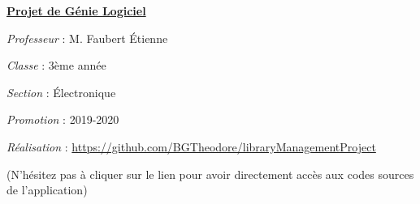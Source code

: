 \documentclass[a4paper,12pt]{report}
\begin{document}
\begin{center}
    \textbf{\underline{Projet de Génie Logiciel}} \par 
    \textit{Professeur} : M. Faubert Étienne \par 
    \textit{Classe} : 3ème année \par 
    \textit{Section} : Électronique \par 
    \textit{Promotion} : 2019-2020 \par 
    \textit{Réalisation} : \url{https://github.com/BGTheodore/libraryManagementProject}\par 
    (N'hésitez pas à cliquer sur le lien pour avoir directement accès aux codes 
    sources de l'application)
\end{center}


\tableofcontents

\chapter*{}













\end{document}
